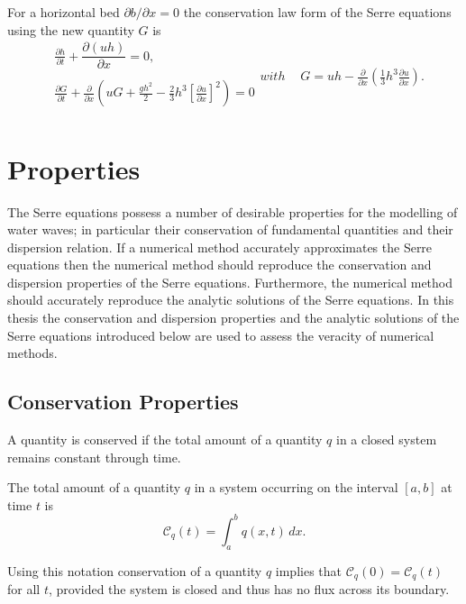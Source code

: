For a horizontal bed $\partial b / \partial x = 0$ the conservation law form of the Serre equations using the new quantity $G$ is
\begin{subequations}
	\label{eqn:FullSerreConHorizBed}
	\begin{align}
	&\frac{\partial h}{\partial t} + \dfrac{\partial (uh)}{\partial x} = 0, \label{eqn:FullSerreConMassHorizBed} \\  \nonumber \\
	&\frac{\partial G}{\partial t}   + \frac{\partial}{\partial x} \left( {u} G + \frac{gh^2}{2} - \frac{2}{3}h^3 \left[\frac{\partial {u}}{\partial x}\right]^2 \right) = 0 \label{eqn:SerreconsconmomHorizBed}\\ \nonumber 
	\end{align}
	with
	\begin{align}
	&G =  {u}h  - \frac{\partial}{\partial x}\left(\frac{1}{3}h^3  \frac{\partial {u}}{\partial x}\right). \label{defn:SerreEqnConservedQuantity1HorizBed}
	\end{align}
\end{subequations}


\section{Properties}
The Serre equations possess a number of desirable properties for the modelling of water waves; in particular their conservation of fundamental quantities and their dispersion relation. If a numerical method accurately approximates the Serre equations then the numerical method should reproduce the conservation and dispersion properties of the Serre equations. Furthermore, the numerical method should accurately reproduce the analytic solutions of the Serre equations. In this thesis the conservation and dispersion properties and the analytic solutions of the Serre equations introduced below are used to assess the veracity of numerical methods. 

\subsection{Conservation Properties}
A quantity is conserved if the total amount of a quantity $q$ in a closed system remains constant through time.
\begin{defn}
	\label{defn:TotalAmmountab}
	The total amount of a quantity $q$ in a system occurring on the interval $[a,b]$ at time $t$ is
	\begin{equation*}
	\mathcal{C}_q(t) = \int_{a}^{b} q(x,t)\, dx.
	\end{equation*}
\end{defn}
Using this notation conservation of a quantity $q$ implies that $\mathcal{C}_{q}(0) = \mathcal{C}_{q}(t)$ for all $t$, provided the system is closed and thus has no flux across its boundary. 

